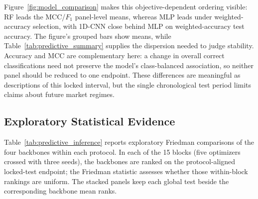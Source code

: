 Figure~\ref{fig:model_comparison} makes this objective-dependent ordering visible: RF leads the MCC/$F_1$ panel-level means, whereas MLP leads under weighted-accuracy selection, with 1D-CNN close behind MLP on weighted-accuracy test accuracy. The figure's grouped bars show means, while Table~\ref{tab:predictive_summary} supplies the dispersion needed to judge stability. Accuracy and MCC are complementary here: a change in overall correct classifications need not preserve the model's class-balanced association, so neither panel should be reduced to one endpoint. These differences are meaningful as descriptions of this locked interval, but the single chronological test period limits claims about future market regimes.

\subsection{Exploratory Statistical Evidence}

Table~\ref{tab:predictive_inference} reports exploratory Friedman comparisons of the four backbones within each protocol. In each of the 15 blocks (five optimizers crossed with three seeds), the backbones are ranked on the protocol-aligned locked-test endpoint; the Friedman statistic assesses whether those within-block rankings are uniform. The stacked panels keep each global test beside the corresponding backbone mean ranks.

